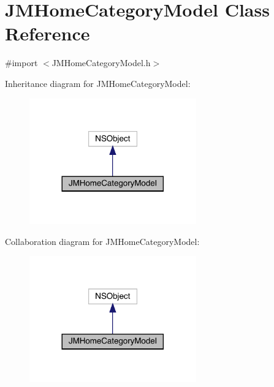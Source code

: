\hypertarget{interface_j_m_home_category_model}{}\section{J\+M\+Home\+Category\+Model Class Reference}
\label{interface_j_m_home_category_model}


{\ttfamily \#import $<$J\+M\+Home\+Category\+Model.\+h$>$}



Inheritance diagram for J\+M\+Home\+Category\+Model\+:\nopagebreak
\begin{figure}[H]
\begin{center}
\leavevmode
\includegraphics[width=204pt]{interface_j_m_home_category_model__inherit__graph}
\end{center}
\end{figure}


Collaboration diagram for J\+M\+Home\+Category\+Model\+:\nopagebreak
\begin{figure}[H]
\begin{center}
\leavevmode
\includegraphics[width=204pt]{interface_j_m_home_category_model__coll__graph}
\end{center}
\end{figure}
